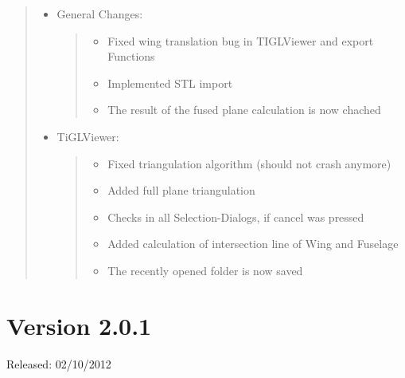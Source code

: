 \documentclass[]{scrartcl}
\begin{document}
\begin{quote}
\begin{itemize}
\item
  General Changes:

  \begin{quote}
  \begin{itemize}
  \itemsep1pt\parskip0pt
  \item
    Fixed wing translation bug in TIGLViewer and export Functions
  \item
    Implemented STL import
  \item
    The result of the fused plane calculation is now chached
  \end{itemize}
  \end{quote}
\item
  TiGLViewer:

  \begin{quote}
  \begin{itemize}
  \itemsep1pt\parskip0pt
  \item
    Fixed triangulation algorithm (should not crash anymore)
  \item
    Added full plane triangulation
  \item
    Checks in all Selection-Dialogs, if cancel was pressed
  \item
    Added calculation of intersection line of Wing and Fuselage
  \item
    The recently opened folder is now saved
  \end{itemize}
  \end{quote}
\end{itemize}
\end{quote}

\section{Version 2.0.1}

Released: 02/10/2012
\end{document}
